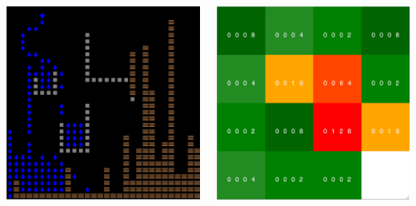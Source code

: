 \documentclass[aspectratio=169]{beamer}
\begin{document}
\begin{frame}
\begin{columns}
    \includegraphics[width=1.0\linewidth]{viz_figs/game-fallingsand.png}

    \includegraphics[width=1.0\linewidth]{viz_figs/game-2048.png}
  \end{columns}
  
\end{frame}
\end{document}
